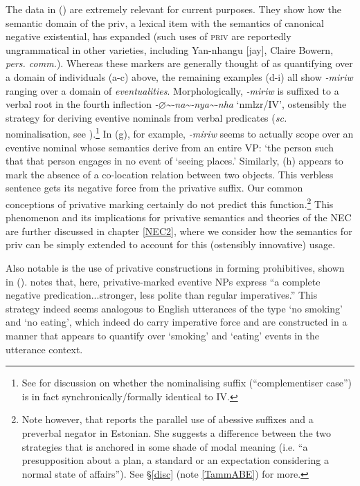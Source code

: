 \xe


The data in (\lastx) are extremely relevant for current purposes. They show how the semantic domain of the \gls{priv}, a lexical item with the semantics of canonical negative existential, has expanded (such uses of \textsc{priv} are reportedly ungrammatical in other varieties, including Yan-nhangu [\gls{jay}], Claire Bowern, \textsl{pers. comm.}). Whereas these markers are generally thought of as quantifying over a domain of individuals (a-c) above, the remaining examples (d-i) all show \textit{-miriw} ranging over a domain of \textit{eventualities}. Morphologically, \mbox{\textit{-miriw}} is suffixed to a verbal root in the fourth inflection \textit{-$\varnothing$\textasciitilde-na\textasciitilde-nya\textasciitilde-nha} `\gls{nmlzr}/\gls{IV}', ostensibly the strategy for deriving eventive nominals from verbal predicates (\textit{sc.} nominalisation, see \citealt[103]{Lowe1996}).\footnote{See \citet[630]{Wilkinson1991} for discussion on whether the nominalising suffix (``complementiser case'') is in fact synchronically/formally identical to \gls{IV}.} In (g), for example, \textit{-miriw} seems to actually scope over an eventive nominal whose semantics derive from an entire VP: `the person such that that person engages in no event of `seeing places.' Similarly, (h) appears to mark the absence of a co-location relation between two objects. This verbless sentence gets its negative force from the privative suffix. Our common conceptions of privative marking certainly do not predict this function.\footnote{Note however, that \citet{Tamm2009,Tamm2015} reports the parallel use of abessive suffixes and a preverbal negator in Estonian. She suggests a difference between the two strategies that is anchored in some shade of modal meaning (i.e. ``a presupposition about a plan, a standard or an expectation considering a normal state of affairs''). See §\ref{disc} (note \ref{TammABE}) for more.} This phenomenon and its implications for privative semantics and theories of the \acrshort{NEC} are further discussed in chapter \ref{NEC2}, where we consider how the semantics for \gls{priv} can be simply extended to account for this (ostensibly innovative) usage.

Also notable is the use of privative constructions in forming prohibitives, shown in (). \citet[446]{Wilkinson1991} notes that, here, privative-marked eventive NPs express ``a complete negative predication...stronger, less polite than regular imperatives.'' This strategy indeed seems analogous to English utterances of the type `no smoking' and `no eating', which indeed do carry imperative force and are constructed in a manner that appears to quantify over `smoking' and `eating' events in the utterance context.

